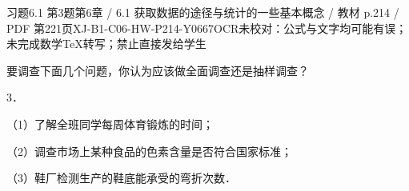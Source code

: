 \begin{bankitem}{习题6.1 第3题}{第6章 / 6.1 获取数据的途径与统计的一些基本概念 / 教材 p.214 / PDF 第221页}{XJ-B1-C06-HW-P214-Y0667}{OCR未校对：公式与文字均可能有误；未完成数学TeX转写；禁止直接发给学生}
\begin{ocrdraft}
\par
要调查下面几个问题，你认为应该做全面调查还是抽样调查？
\par
3．
\par
（1）了解全班同学每周体育锻炼的时间；
\par
（2）调查市场上某种食品的色素含量是否符合国家标准；
\par
（3）鞋厂检测生产的鞋底能承受的弯折次数．
\end{ocrdraft}
\end{bankitem}
